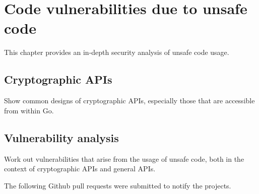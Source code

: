
\chapter{Code vulnerabilities due to unsafe code}\label{ch:code-vulnerabilities}

This chapter provides an in-depth security analysis of unsafe code usage.



\section{Cryptographic APIs}\label{sec:cryptographic-apis}

Show common designs of cryptographic APIs, especially those that are accessible from
within Go.



\section{Vulnerability analysis}\label{sec:vulnerability-analysis}

Work out vulnerabilities that arise from the usage of unsafe code, both in the context
of cryptographic APIs and general APIs.

The following Github pull requests were submitted to notify the projects.

